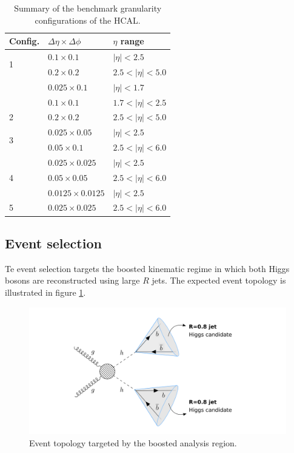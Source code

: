 \begin{table}
	\centering
	\begin{tabular}{lll}
		\toprule 
		\textbf{Config.} & $\Delta \eta \times \Delta \phi$ & $\eta$ range\\
		\midrule
		\multirow{2}{*}{1} & $0.1\times 0.1$  & $|\eta|<2.5$\\
		& $0.2\times 0.2$ & $2.5<|\eta|<5.0$ \\
		\cellcolor{black!7} &\cellcolor{black!7} $0.025\times 0.1$  & \cellcolor{black!7}$|\eta|<1.7$\\
		\cellcolor{black!7} & \cellcolor{black!7}$0.1\times 0.1$  & \cellcolor{black!7}$1.7<|\eta|<2.5$\\
		\multirow{-3}{*}{2} \cellcolor{black!7}& \cellcolor{black!7}$0.2\times 0.2$  &\cellcolor{black!7} $2.5<|\eta|<5.0$\\
		\multirow{2}{*}{3 }& $0.025\times0.05$ & $|\eta|<2.5$\\
		& $0.05\times 0.1$ & $2.5<|\eta|<6.0$ \\
		\cellcolor{black!7}&  \cellcolor{black!7}$0.025\times0.025$ &  \cellcolor{black!7}$|\eta|<2.5$\\
		\multirow{-2}{*}{4}\cellcolor{black!7}&  \cellcolor{black!7}$0.05\times 0.05$ & \cellcolor{black!7} $2.5<|\eta|<6.0$ \\
		& $0.0125\times0.0125$ &$|\eta|<2.5$\\
		\multirow{-2}{*}{5 }&$0.025\times 0.025$ & $2.5<|\eta|<6.0$\\
		\bottomrule
	\end{tabular}
	\caption{Summary of the benchmark granularity configurations of the HCAL.}
	\label{table:Gran}
\end{table}

\subsection{Event selection}

Te event selection targets the boosted kinematic regime in which both Higgs bosons are reconstructed using large $R$ jets. The expected event topology is illustrated in figure \ref{fig:boosted}.

\begin{figure}[h]
	\centering
	\includegraphics[trim={4.5cm .5cm 1cm .5cm},clip,width=1.2\linewidth]{./images/boosted1.png}
	\caption{Event topology targeted by the boosted analysis region.}
	\label{fig:boosted}
\end{figure}

